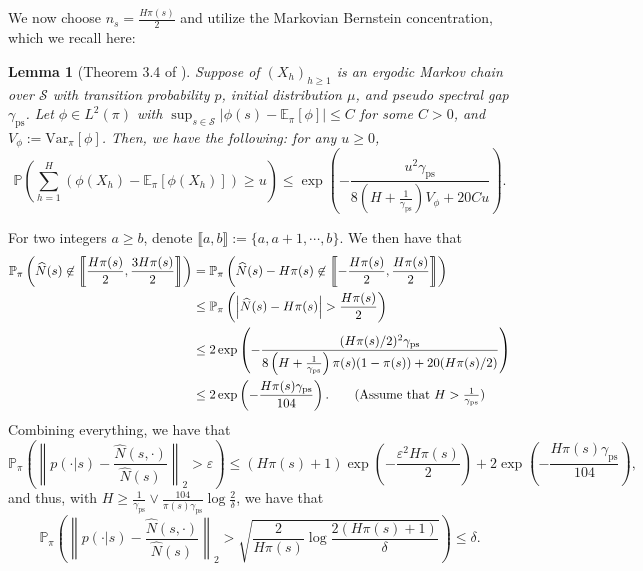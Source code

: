 \documentclass[twoside]{article}
\def\gS{{\mathcal{S}}}
\def\sP{{\mathbb{P}}}
\newcommand{\E}{\mathbb{E}}
\newcommand{\Var}{\mathrm{Var}}
\theoremstyle{plain}
\newtheorem{lemma}{Lemma}[section]
\def\bignorm#1{\left\lVert #1 \right\rVert}
\newcommand{\ps}{\mathrm{ps}}
\begin{document}
We now choose $n_s = \frac{H \pi(s)}{2}$ and utilize the Markovian Bernstein concentration, which we recall here:
\begin{lemma}[Theorem 3.4 of \citet{paulin2015markov}]
\label{lem:paulin}
    Suppose of $(X_h)_{h \geq 1}$ is an ergodic Markov chain over $\gS$ with transition probability $p$, initial distribution $\mu$, and pseudo spectral gap $\gamma_\ps$.
    Let $\phi \in L^2(\pi)$ with $\sup_{s \in \gS} |\phi(s) - \E_\pi[\phi]| \leq C$ for some $C > 0$, and $V_\phi := \Var_\pi[\phi]$.
    Then, we have the following:
    for any $u \geq 0$,
    \begin{equation}
        \sP\left( \sum_{h=1}^H (\phi(X_h) - \E_\pi[\phi(X_h)]) \geq u \right) \leq \exp\left( - \frac{u^2 \gamma_\ps}{8 \left( H + \frac{1}{\gamma_\ps} \right) V_\phi + 20 C u} \right).
    \end{equation}
\end{lemma}
For two integers $a \geq b$, denote $\llbracket a, b \rrbracket := \{a, a+1, \cdots, b\}$.
We then have that
\begin{align*}
	\sP_\pi\left( \widehat{N}(s) \not\in \left\llbracket \frac{H \pi(s)}{2}, \frac{3 H \pi(s)}{2} \right\rrbracket \right) &= \sP_\pi\left( \widehat{N}(s) - H \pi(s) \not\in \left\llbracket - \frac{H \pi(s)}{2}, \frac{H \pi(s)}{2} \right\rrbracket \right) \\
	&\leq \sP_\pi\left( \left| \widehat{N}(s) - H \pi(s) \right| > \frac{H \pi(s)}{2} \right) \\
	&\leq 2 \exp\left( - \frac{(H \pi(s) / 2)^2 \gamma_\ps}{8 \left( H + \frac{1}{\gamma_\ps} \right) \pi(s) (1 - \pi(s)) + 20 (H \pi(s) / 2)} \right) \\
	&\leq 2 \exp\left( - \frac{H \pi(s) \gamma_\ps}{104} \right). \tag{Assume that $H > \frac{1}{\gamma_\ps}$}
\end{align*}
Combining everything, we have that
\begin{equation*}
	\sP_\pi\left( \bignorm{ p(\cdot | s) - \frac{\widehat{N}(s, \cdot)}{\widehat{N}(s)} }_2 > \varepsilon \right)
	\leq (H\pi(s) + 1) \exp\left( - \frac{\varepsilon^2 H\pi(s)}{2} \right) + 2 \exp\left( - \frac{H \pi(s) \gamma_\ps}{104} \right),
\end{equation*}
and thus, with $H \geq \frac{1}{\gamma_\ps} \vee \frac{104}{\pi(s) \gamma_\ps} \log\frac{2}{\delta}$, we have that
\begin{equation}
\label{eqn:p-concentration}
	\sP_\pi\left( \bignorm{ p(\cdot | s) - \frac{\widehat{N}(s, \cdot)}{\widehat{N}(s)} }_2 > \sqrt{\frac{2}{H \pi(s)} \log\frac{2(H\pi(s) + 1)}{\delta}} \right)
	\leq \delta.
\end{equation}
\end{document}
